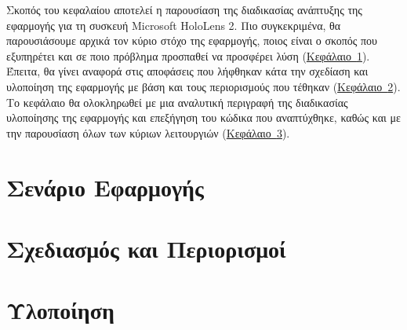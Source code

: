 
Σκοπός του κεφαλαίου αποτελεί η παρουσίαση της διαδικασίας ανάπτυξης της εφαρμογής για τη συσκευή Microsoft HoloLens 2. Πιο συγκεκριμένα, θα παρουσιάσουμε αρχικά τον κύριο στόχο της εφαρμογής, ποιος είναι ο σκοπός που εξυπηρέτει και σε ποιο πρόβλημα προσπαθεί να προσφέρει λύση (\hyperref[sec:appScenario]{Κεφάλαιο~\ref*{sec:appScenario}}). Έπειτα, θα γίνει αναφορά στις αποφάσεις που λήφθηκαν κάτα την σχεδίαση και υλοποίηση της εφαρμογής με βάση και τους περιορισμούς που τέθηκαν (\hyperref[sec:appDesignAndLimitations]{Κεφάλαιο~\ref*{sec:appDesignAndLimitations}}). Το κεφάλαιο θα ολοκληρωθεί με μια αναλυτική περιγραφή της διαδικασίας υλοποίησης της εφαρμογής και επεξήγηση του κώδικα που αναπτύχθηκε, καθώς και με την παρουσίαση όλων των κύριων λειτουργιών (\hyperref[sec:appImplementation]{Κεφάλαιο~\ref*{sec:appImplementation}}).

\section{Σενάριο Εφαρμογής}\label{sec:appScenario}


\section{Σχεδιασμός και Περιορισμοί}\label{sec:appDesignAndLimitations}


\section{Υλοποίηση}\label{sec:appImplementation}



